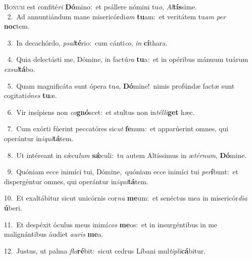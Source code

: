 \lettrine{\initial\textcolor{\initialcolor}{B}}{onum} est confité\textit{ri} \textbf{Dó}\-mino:~\star et psállere nómini tu\-\textit{o}\-, \textit{Al}\-\textbf{tís}sime.\\
{\numbfont\textcolor{\numbcolor}{~2.}}~Ad annuntiándum mane misericórdi\textit{am} \textbf{tu}\-am:~\star et veritátem tu\textit{am} \textit{per} \textbf{noc}\-tem.\par
{\numbfont\textcolor{\numbcolor}{~3.}}~In decachórdo, \textit{psal}\-\textbf{té}rio:~\star cum cánti\-\textit{co}\-, \textit{in} \textbf{cí}\-thara.\par
{\numbfont\textcolor{\numbcolor}{~4.}}~Quia delectásti me, Dómine, in factú\textit{ra} \textbf{tu}\-a:~\star et in opéribus mánuum tuárum \textit{ex}\-\textit{sul}\textbf{tá}bo.\par
{\numbfont\textcolor{\numbcolor}{~5.}}~Quam magnificáta sunt ópera tu\-\textit{a}\-, \textbf{Dó}\-mine!~\star nimis profúndæ factæ sunt cogitati\-\textit{ó}\-\textit{nes} \textbf{tu}\-æ.\par
{\numbfont\textcolor{\numbcolor}{~6.}}~Vir insípiens non \textit{co}\-\textbf{gnó}scet:~\star et stultus non in\-\textit{tél}\-\textit{li}\textbf{get} hæc.\par
{\numbfont\textcolor{\numbcolor}{~7.}}~Cum exórti fúerint peccatóres sic\textit{ut} \textbf{fe}\-num:~\star et apparúerint omnes, qui operántur in\-\textit{i}\-\textit{qui}\textbf{tá}tem.\par
{\numbfont\textcolor{\numbcolor}{~8.}}~Ut intéreant in sǽcu\textit{lum} \textbf{sǽ}\-culi:~\star tu autem Altíssimus in æ\-\textit{tér}\-\textit{num}, \textbf{Dó}\-mine.\par
{\numbfont\textcolor{\numbcolor}{~9.}}~Quóniam ecce inimíci tui, Dómine,~\dagger quóniam ecce inimíci tui \textit{per}\-\textbf{í}bunt:~\star et dispergéntur omnes, qui operántur in\-\textit{i}\-\textit{qui}\textbf{tá}tem.\par
{\numbfont\textcolor{\numbcolor}{10.}}~Et exaltábitur sicut unicórnis cor\textit{nu} \textbf{me}\-um:~\star et senéctus mea in misericór\-\textit{di}\-\textit{a} \textbf{ú}\-beri.\par
{\numbfont\textcolor{\numbcolor}{11.}}~Et despéxit óculus meus inimí\textit{cos} \textbf{me}\-os:~\star et in insurgéntibus in me malignántibus áudiet \textit{au}\-\textit{ris} \textbf{me}\-a.\par
{\numbfont\textcolor{\numbcolor}{12.}}~Justus, ut palma \textit{flo}\-\textbf{ré}bit:~\star sicut cedrus Líbani mul\-\textit{ti}\-\textit{pli}\textbf{cá}bitur.\par

